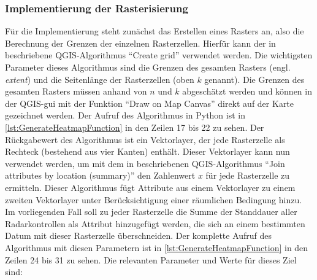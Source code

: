 \subsubsection{Implementierung der Rasterisierung}
\label{sec:RasterisierungImplementierung}
Für die Implementierung steht zunächst das Erstellen eines Rasters an, also die Berechnung der Grenzen der einzelnen Rasterzellen.
Hierfür kann der in \cite{QgisCreateGrid} beschriebene QGIS-Algorithmus "`Create grid"' verwendet werden.
Die wichtigsten Parameter dieses Algorithmus sind die Grenzen des gesamten Rasters (engl. \emph{extent}) und die Seitenlänge der Rasterzellen (oben $k$ genannt).
Die Grenzen des gesamten Rasters müssen anhand von $n$ und $k$ abgeschätzt werden und können in der QGIS-\acrshort{gui} mit der Funktion "`Draw on Map Canvas"' direkt auf der Karte gezeichnet werden.
Der Aufruf des Algorithmus in Python ist in \autoref{lst:GenerateHeatmapFunction} in den Zeilen 17 bis 22 zu sehen.
Der Rückgabewert des Algorithmus ist ein Vektorlayer, der jede Rasterzelle als Rechteck (bestehend aus vier Kanten) enthält.
Dieser Vektorlayer kann nun verwendet werden, um mit dem in \cite{QgisJoinByLocationSummary} beschriebenen QGIS-Algorithmus "`Join attributes by location (summary)"' den Zahlenwert $x$ für jede Rasterzelle zu ermitteln.
Dieser Algorithmus fügt Attribute aus einem Vektorlayer zu einem zweiten Vektorlayer unter Berücksichtigung einer räumlichen Bedingung hinzu.
Im vorliegenden Fall soll zu jeder Rasterzelle die Summe der Standdauer aller Radarkontrollen als Attribut hinzugefügt werden, die sich an einem bestimmten Datum mit dieser Rasterzelle überschneiden.
Der komplette Aufruf des Algorithmus mit diesen Parametern ist in \autoref{lst:GenerateHeatmapFunction} in den Zeilen 24 bis 31 zu sehen.
Die relevanten Parameter und Werte für dieses Ziel sind:

